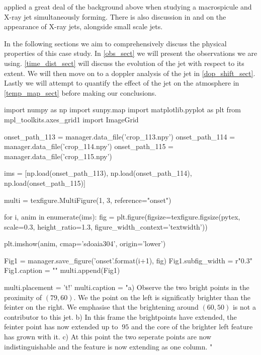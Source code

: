 \documentclass{emulateapj}
\begin{document}
\cite{Kamio2010} applied a great deal of the background above when studying a macrospicule and X-ray jet simultaneously forming. There is also discussion in \cite{Pike_Harrison1997} and \cite{Kim2007} on the appearance of X-ray jets, alongside small scale jets.

In the following sections we aim to comprehensively discuss the physical properties of this case study. In \ref{obs_sect} we will present the observations we are using. \ref{time_dist_sect} will discuss the evolution of the jet with respect to its extent. We will then move on to a doppler analysis of the jet in \ref{dop_shift_sect}. Lastly we will attempt to quantify the effect of the jet on the atmosphere in \ref{temp_map_sect} before making our conclusions.

 
 





\begin{pycode}[Onset]
import numpy as np
import sunpy.map
import matplotlib.pyplot as plt
from mpl_toolkits.axes_grid1 import ImageGrid

onset_path_113 = manager.data_file('crop_113.npy')
onset_path_114 = manager.data_file('crop_114.npy')
onset_path_115 = manager.data_file('crop_115.npy')

ims = [np.load(onset_path_113), np.load(onset_path_114), np.load(onset_path_115)]


multi = texfigure.MultiFigure(1, 3, reference="onset")

for i, anim in enumerate(ims):
	fig = plt.figure(figsize=texfigure.figsize(pytex, scale=0.3, height_ratio=1.3, figure_width_context='textwidth'))
	
	plt.imshow(anim, cmap='sdoaia304', origin='lower')
	
	Fig1 = manager.save_figure('onset{}'.format(i+1), fig)
	Fig1.subfig_width = r"0.3\textwidth"
	Fig1.caption = ""
	multi.append(Fig1)

multi.placement = 't!'
multi.caption = "a) Observe the two bright points in the proximity of $(79, 60)$. We the point on the left is significatly brighter than the feinter on the right. We emphasise that the brightening around $(60, 50)$ is not a contributor to this jet. b) In this frame the brightpoints have extended, the feinter point has now extended up to $~95$ and the core of the brighter left feature has grown with it. c) At this point the two seperate points are now indistinguishable and the feature is now extending as one column. "
\end{pycode}
\end{document}
